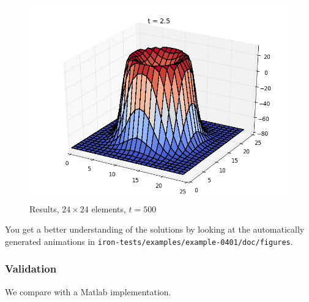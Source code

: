 \begin{figure}[ht]
  \centering
  \includegraphics[width=0.9\columnwidth]{examples/example-0401/doc/figures/current_run_l1x1_n24x24_i1_s0_p1__t500.png}
  \caption{Results, $24 \times 24$ elements, $t=500$}
  \label{example-0401-current-run3-fig}
\end{figure}


You get a better understanding of the solutions by looking at the automatically generated animations in \verb|iron-tests/examples/example-0401/doc/figures|.

%
\subsubsection{Validation}
%
We compare with a Matlab implementation.
%
